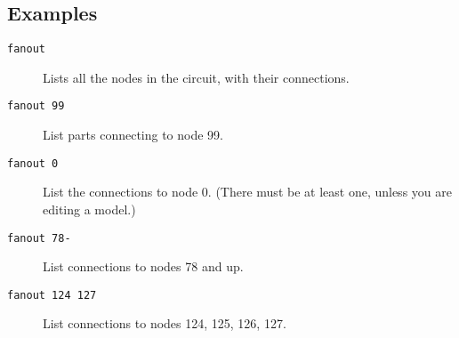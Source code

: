 \subsection{Examples}

\begin{description}

\item[{\tt fanout}] Lists all the nodes in the circuit, with their
connections.

\item[{\tt fanout 99}] List parts connecting to node 99.

\item[{\tt fanout 0}] List the connections to node 0.  (There must be at
least one, unless you are editing a model.)

\item[{\tt fanout 78-}] List connections to nodes 78 and up.

\item[{\tt fanout 124 127}] List connections to nodes 124, 125, 126, 127.

\end{description}
